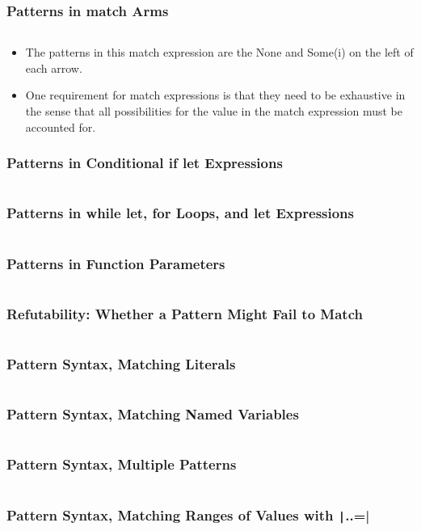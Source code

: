 \documentclass{beamer}
\begin{document}
\begin{frame}[fragile]
	\frametitle{Patterns in match Arms}
	\inputminted{rust}{./code/match1.rs}
	
	\begin{itemize}
		\item The patterns in this match expression are the None and Some(i) on the left of each arrow.
		\item 	One requirement for match expressions is that they need to be exhaustive in the sense that all possibilities for the value in the match expression must be accounted for.
	\end{itemize}
\end{frame}


\begin{frame}[fragile]
	\frametitle{Patterns in Conditional if let Expressions}
	\inputminted{rust}{./code/pattern1.rs}
\end{frame}

\begin{frame}[fragile]
	\frametitle{Patterns in while let, for Loops, and let Expressions}
	\inputminted{rust}{./code/pattern2.rs}
\end{frame}


\begin{frame}[fragile]
	\frametitle{Patterns in Function Parameters}
	\inputminted{rust}{./code/pattern3.rs}
\end{frame}

\begin{frame}[fragile]
	\frametitle{Refutability: Whether a Pattern Might Fail to Match}
	\inputminted{rust}{./code/pattern4.rs}
\end{frame}


\begin{frame}[fragile]
	\frametitle{Pattern Syntax, Matching Literals}
	\inputminted{rust}{./code/pattern5.rs}
\end{frame}

\begin{frame}[fragile]
	\frametitle{Pattern Syntax, Matching Named Variables}
	\inputminted{rust}{./code/pattern7.rs}
\end{frame}


\begin{frame}[fragile]
	\frametitle{Pattern Syntax, Multiple Patterns}
	\inputminted{rust}{./code/pattern8.rs}
\end{frame}


\begin{frame}[fragile]
	\frametitle{Pattern Syntax, Matching Ranges of Values with \texttt|..=|}
	\inputminted{rust}{./code/pattern9.rs}
\end{frame}
\end{document}
